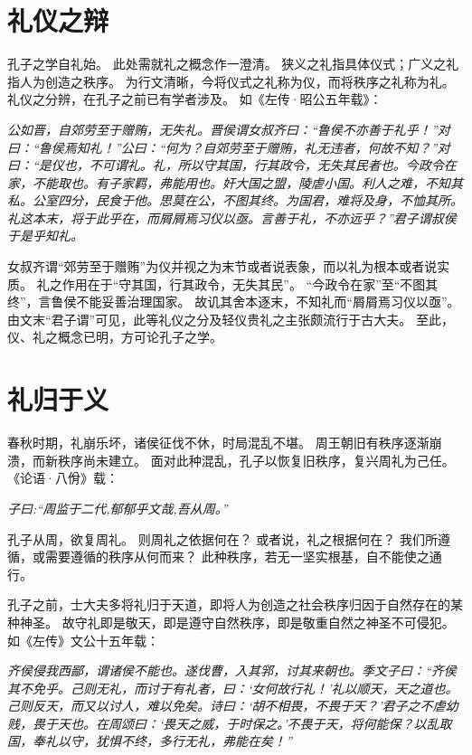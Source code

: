 \documentclass[11pt]{article}
\begin{document}
\newline

\section{礼仪之辩}
孔子之学自礼始。
此处需就礼之概念作一澄清。
狭义之礼指具体仪式；广义之礼指人为创造之秩序。
为行文清晰，今将仪式之礼称为仪，而将秩序之礼称为礼。
礼仪之分辨，在孔子之前已有学者涉及。
如《左传·昭公五年载》：

\textit{公如晋，自郊劳至于赠贿，无失礼。晋侯谓女叔齐曰：“鲁侯不亦善于礼乎！”对曰：“鲁侯焉知礼！”公曰：“何为？自郊劳至于赠贿，礼无违者，何故不知？”对曰：“是仪也，不可谓礼。礼，所以守其国，行其政令，无失其民者也。今政令在家，不能取也。有子家羁，弗能用也。奸大国之盟，陵虐小国。利人之难，不知其私。公室四分，民食于他。思莫在公，不图其终。为国君，难将及身，不恤其所。礼这本末，将于此乎在，而屑屑焉习仪以亟。言善于礼，不亦远乎？”君子谓叔侯于是乎知礼。}

女叔齐谓“郊劳至于赠贿”为仪并视之为末节或者说表象，而以礼为根本或者说实质。
礼之作用在于“守其国，行其政令，无失其民”。
“今政令在家”至“不图其终”，言鲁侯不能妥善治理国家。
故讥其舍本逐末，不知礼而“屑屑焉习仪以亟”。
由文末“君子谓”可见，此等礼仪之分及轻仪贵礼之主张颇流行于古大夫。
至此，仪、礼之概念已明，方可论孔子之学。

\newline

\section{礼归于义}
春秋时期，礼崩乐坏，诸侯征伐不休，时局混乱不堪。
周王朝旧有秩序逐渐崩溃，而新秩序尚未建立。
面对此种混乱，孔子以恢复旧秩序，复兴周礼为己任。
《论语·八佾》载：

\textit{子曰:“周监于二代,郁郁乎文哉,吾从周。”}

孔子从周，欲复周礼。
则周礼之依据何在？
或者说，礼之根据何在？
我们所遵循，或需要遵循的秩序从何而来？
此种秩序，若无一坚实根基，自不能使之通行。

\newline

孔子之前，士大夫多将礼归于天道，即将人为创造之社会秩序归因于自然存在的某种神圣。
故守礼即是敬天，即是遵守自然秩序，即是敬重自然之神圣不可侵犯。
如《左传》文公十五年载：

\textit{齐侯侵我西鄙，谓诸侯不能也。遂伐曹，入其郛，讨其来朝也。季文子曰：“齐侯其不免乎。己则无礼，而讨于有礼者，曰：‘女何故行礼！’礼以顺天，天之道也。己则反天，而又以讨人，难以免矣。诗曰：‘胡不相畏，不畏于天？’君子之不虐幼贱，畏于天也。在周颂曰：‘畏天之威，于时保之。’不畏于天，将何能保？以乱取国，奉礼以守，犹惧不终，多行无礼，弗能在矣！”}
\end{document}
